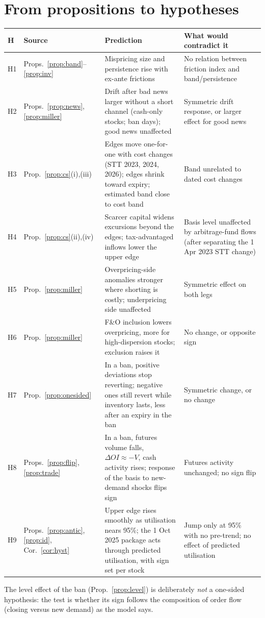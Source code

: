 \documentclass[11pt,a4paper]{article}
\theoremstyle{plain}
\theoremstyle{definition}
\theoremstyle{remark}
\begin{document}
\section{From propositions to hypotheses}\label{sec:map}
\begin{center}
\small
\begin{tabularx}{\textwidth}{>{\raggedright\arraybackslash}p{0.8cm}>{\raggedright\arraybackslash}p{2.3cm}>{\raggedright\arraybackslash}X>{\raggedright\arraybackslash}X}
\toprule
H & Source & Prediction & What would contradict it \\
\midrule
H1 & Props.~\ref{prop:band}--\ref{prop:inv} & Mispricing size and persistence rise with ex-ante frictions & No relation between friction index and band/persistence \\
H2 & Props.~\ref{prop:news}, \ref{prop:miller} & Drift after bad news larger without a short channel (cash-only stocks; ban days); good news unaffected & Symmetric drift response, or larger effect for good news \\
H3 & Prop.~\ref{prop:cs}(i),(iii) & Edges move one-for-one with cost changes (STT 2023, 2024, 2026); edges shrink toward expiry; estimated band close to cost band & Band unrelated to dated cost changes \\
H4 & Prop.~\ref{prop:cs}(ii),(iv) & Scarcer capital widens excursions beyond the edges; tax-advantaged inflows lower the upper edge & Basis level unaffected by arbitrage-fund flows (after separating the 1 Apr 2023 STT change) \\
H5 & Prop.~\ref{prop:miller} & Overpricing-side anomalies stronger where shorting is costly; underpricing side unaffected & Symmetric effect on both legs \\
H6 & Prop.~\ref{prop:miller} & F\&O inclusion lowers overpricing, more for high-dispersion stocks; exclusion raises it & No change, or opposite sign \\
H7 & Prop.~\ref{prop:onesided} & In a ban, positive deviations stop reverting; negative ones still revert while inventory lasts, less after an expiry in the ban & Symmetric change, or no change \\
H8 & Props.~\ref{prop:flip}, \ref{prop:trade} & In a ban, futures volume falls, $\Delta OI\approx -V$, cash activity rises; response of the basis to new-demand shocks flips sign & Futures activity unchanged; no sign flip \\
H9 & Props.~\ref{prop:antic}, \ref{prop:id}, Cor.~\ref{cor:hyst} & Upper edge rises smoothly as utilisation nears 95\%; the 1 Oct 2025 package acts through predicted utilisation, with sign set per stock & Jump only at 95\% with no pre-trend; no effect of predicted utilisation \\
\bottomrule
\end{tabularx}
\end{center}
The level effect of the ban (Prop.~\ref{prop:level}) is deliberately \emph{not} a one-sided hypothesis: the test is whether
its sign follows the composition of order flow (closing versus new demand) as the model says.
\end{document}
